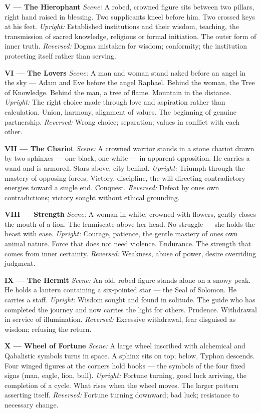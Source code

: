 \textbf{V --- The Hierophant} \emph{Scene:} A robed, crowned figure sits between two pillars, right hand raised in blessing. Two supplicants kneel before him. Two crossed keys at his feet. \emph{Upright:} Established institutions and their wisdom, teaching, the transmission of sacred knowledge, religious or formal initiation. The outer form of inner truth. \emph{Reversed:} Dogma mistaken for wisdom; conformity; the institution protecting itself rather than serving.

\textbf{VI --- The Lovers} \emph{Scene:} A man and woman stand naked before an angel in the sky --- Adam and Eve before the angel Raphael. Behind the woman, the Tree of Knowledge. Behind the man, a tree of flame. Mountain in the distance. \emph{Upright:} The right choice made through love and aspiration rather than calculation. Union, harmony, alignment of values. The beginning of genuine partnership. \emph{Reversed:} Wrong choice; separation; values in conflict with each other.

\textbf{VII --- The Chariot} \emph{Scene:} A crowned warrior stands in a stone chariot drawn by two sphinxes --- one black, one white --- in apparent opposition. He carries a wand and is armored. Stars above, city behind. \emph{Upright:} Triumph through the mastery of opposing forces. Victory, discipline, the will directing contradictory energies toward a single end. Conquest. \emph{Reversed:} Defeat by one\textquotesingle s own contradictions; victory sought without ethical grounding.

\textbf{VIII --- Strength} \emph{Scene:} A woman in white, crowned with flowers, gently closes the mouth of a lion. The lemniscate above her head. No struggle --- she holds the beast with ease. \emph{Upright:} Courage, patience, the gentle mastery of one\textquotesingle s own animal nature. Force that does not need violence. Endurance. The strength that comes from inner certainty. \emph{Reversed:} Weakness, abuse of power, desire overriding judgment.

\textbf{IX --- The Hermit} \emph{Scene:} An old, robed figure stands alone on a snowy peak. He holds a lantern containing a six-pointed star --- the Seal of Solomon. He carries a staff. \emph{Upright:} Wisdom sought and found in solitude. The guide who has completed the journey and now carries the light for others. Prudence. Withdrawal in service of illumination. \emph{Reversed:} Excessive withdrawal, fear disguised as wisdom; refusing the return.

\textbf{X --- Wheel of Fortune} \emph{Scene:} A large wheel inscribed with alchemical and Qabalistic symbols turns in space. A sphinx sits on top; below, Typhon descends. Four winged figures at the corners hold books --- the symbols of the four fixed signs (man, eagle, lion, bull). \emph{Upright:} Fortune turning, good luck arriving, the completion of a cycle. What rises when the wheel moves. The larger pattern asserting itself. \emph{Reversed:} Fortune turning downward; bad luck; resistance to necessary change.

